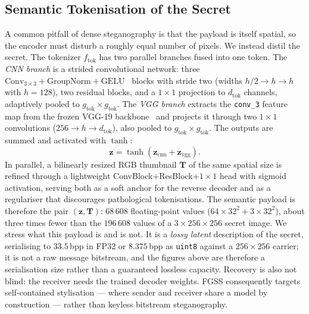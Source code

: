 \documentclass[conference]{IEEEtran}
\begin{document}
\subsection{Semantic Tokenisation of the Secret}
\label{sec:tok}
A common pitfall of dense steganography is that the payload is itself spatial, so the encoder must disturb a roughly equal number of pixels. We instead distil the secret. The tokenizer $f_{\text{tok}}$ has two parallel branches fused into one token. The \emph{CNN branch} is a strided convolutional network: three $\text{Conv}_{3{\times}3}{+}\text{GroupNorm}{+}\text{GELU}$~\cite{gelu} blocks with stride two (widths $h/2 \!\to\! h \!\to\! h$ with $h\!=\!128$), two residual blocks, and a $1\!\times\!1$ projection to $d_{\text{tok}}$ channels, adaptively pooled to $g_{\text{tok}}\!\times\!g_{\text{tok}}$. The \emph{VGG branch} extracts the \texttt{conv\_3} feature map from the frozen VGG-19 backbone~\cite{vgg} and projects it through two $1\!\times\!1$ convolutions ($256 \!\to\! h \!\to\! d_{\text{tok}}$), also pooled to $g_{\text{tok}}\!\times\!g_{\text{tok}}$. The outputs are summed and activated with $\tanh$:
\begin{equation}
    \mathbf{z} = \tanh\!\left(\mathbf{z}_{\text{cnn}} + \mathbf{z}_{\text{vgg}}\right).
    \label{eq:tok}
\end{equation}
In parallel, a bilinearly resized RGB thumbnail $\mathbf{T}$ of the same spatial size is refined through a lightweight ConvBlock$+$ResBlock$+1\!\times\!1$ head with sigmoid activation, serving both as a soft anchor for the reverse decoder and as a regulariser that discourages pathological tokenisations. The semantic payload is therefore the pair $(\mathbf{z},\mathbf{T})$: $68\,608$ floating-point values ($64\!\times\!32^{2}+3\!\times\!32^{2}$), about three times fewer than the $196\,608$ values of a $3\!\times\!256\!\times\!256$ secret image. We stress what this payload is and is not. It is a \emph{lossy latent} description of the secret, serialising to $33.5$\,bpp in FP32 or $8.375$\,bpp as \texttt{uint8} against a $256\!\times\!256$ carrier; it is not a raw message bitstream, and the figures above are therefore a serialisation size rather than a guaranteed lossless capacity. Recovery is also not blind: the receiver needs the trained decoder weights. FGSS consequently targets self-contained stylisation --- where sender and receiver share a model by construction --- rather than keyless bitstream steganography.
\end{document}

